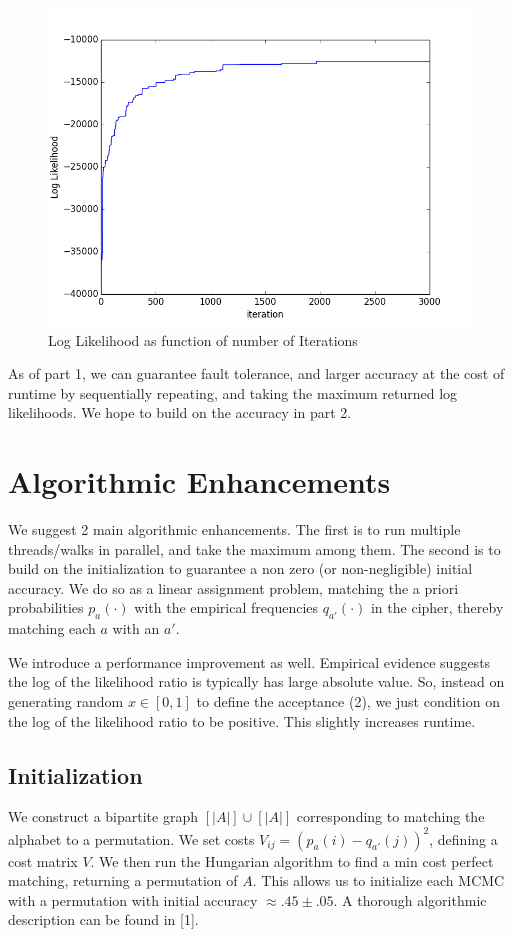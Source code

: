 \documentclass[aps,prd,final,twocolumn,letterpaper]{revtex4}
\begin{document}
\begin{figure}[h]
\centering
\includegraphics[scale=.3]{logl.png}
\caption{Log Likelihood as function of number of Iterations}
\end{figure}

As of part 1, we can guarantee fault tolerance, and larger accuracy at the cost of runtime by sequentially repeating, and taking the maximum returned log likelihoods. We hope to build on the accuracy in part 2.

\section{Algorithmic Enhancements}
We suggest 2 main algorithmic enhancements. The first is to run multiple threads/walks in parallel, and take the maximum among them. The second is to build on the initialization to guarantee a non zero (or non-negligible) initial accuracy. We do so as a linear assignment problem, matching the a priori probabilities $p_a(\cdot)$ with the empirical frequencies $q_{a'}(\cdot)$ in the cipher, thereby matching each $a$ with an $a'$. 

We introduce a performance improvement as well. Empirical evidence suggests the log of the likelihood ratio is typically has large absolute value. So, instead on generating random $x\in[0, 1]$ to define the acceptance (2), we just condition on the log of the likelihood ratio to be positive. This slightly increases runtime.



\subsection{Initialization}
We construct a bipartite graph $[|A|]\cup [|A|]$ corresponding to matching the alphabet to a permutation. We set costs $V_{ij} = (p_a(i)-q_{a'}(j))^2$, defining a cost matrix $V$. We then run the Hungarian algorithm to find a min cost perfect matching, returning a permutation of $A$. This allows us to initialize each MCMC with a permutation with initial accuracy $\approx .45 \pm .05$. A thorough algorithmic description can be found in [1].
\end{document}

